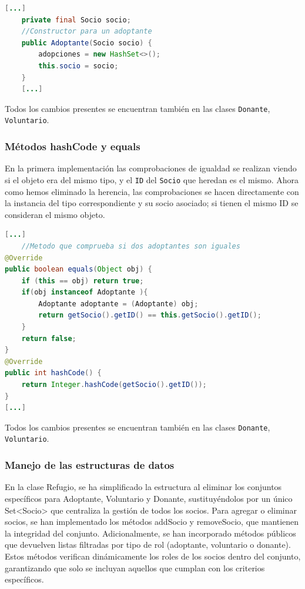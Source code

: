 \begin{lstlisting}[style = javaNormal, language=Java, caption={extracto de la clase Adoptante}] 
    [...]
    private final Socio socio;
    //Constructor para un adoptante
    public Adoptante(Socio socio) {
        adopciones = new HashSet<>();
        this.socio = socio;
    }
    [...]
\end{lstlisting}

Todos los cambios presentes se encuentran también en las clases \texttt{Donante}, \texttt{Voluntario}.

\subsubsection{Métodos hashCode y equals}
En la primera implementación las comprobaciones de igualdad se realizan viendo si el objeto era del mismo tipo, y el \texttt{ID} del \texttt{Socio} que heredan es el mismo.
Ahora como hemos eliminado la herencia, las comprobaciones se hacen directamente con la instancia del tipo correspondiente y su socio asociado; si tienen el mismo ID se consideran el mismo objeto.

\begin{lstlisting}[style = javaNormal, language=Java, caption={extracto de la clase Adoptante}]
    [...] 
    //Metodo que comprueba si dos adoptantes son iguales
@Override
public boolean equals(Object obj) {
    if (this == obj) return true;
    if(obj instanceof Adoptante ){
        Adoptante adoptante = (Adoptante) obj;
        return getSocio().getID() == this.getSocio().getID(); 
    }
    return false;
}
@Override
public int hashCode() {
    return Integer.hashCode(getSocio().getID());
}
[...]
\end{lstlisting}

Todos los cambios presentes se encuentran también en las clases \texttt{Donante}, \texttt{Voluntario}.

\subsubsection{Manejo de las estructuras de datos}
En la clase Refugio, se ha simplificado la estructura al eliminar los conjuntos específicos para Adoptante, 
Voluntario y Donante, sustituyéndolos por un único Set<Socio> que centraliza la gestión de todos los socios. 
Para agregar o eliminar socios, se han implementado los métodos addSocio y removeSocio, que mantienen la integridad del 
conjunto. Adicionalmente, se han incorporado métodos públicos que devuelven listas filtradas por tipo de rol (adoptante, 
voluntario o donante). Estos métodos verifican dinámicamente los roles de los socios dentro del conjunto, garantizando 
que solo se incluyan aquellos que cumplan con los criterios específicos.

